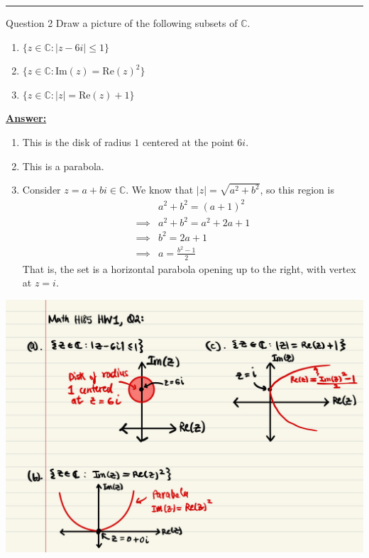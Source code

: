 \documentclass{article}
\newcommand{\C}{\mathbb{C}}
\begin{document}
\vskip 0.5cm
\hrule 
\vskip 0.5cm


\begin{mathdefinitionbox}{Question 2}
\vskip 0.5cm
  Draw a picture of the following subsets of $\C$.
  \begin{enumerate}[label=(\alph*)]
    \item $\{ z \in \C : |z - 6i| \leq 1 \}$
    \item $\{ z \in \C : \text{Im}(z) = \text{Re}(z)^2 \}$
    \item $\{ z \in \C : |z| = \text{Re}(z) + 1 \}$
  \end{enumerate}
\end{mathdefinitionbox}

\vskip 0.5cm
\underline{\textbf{Answer:}} 

\begin{enumerate}[label=(\alph*)]
  \item This is the disk of radius $1$ centered at the point $6i$.

  \vskip 0.5cm
  \item This is a parabola.
  
  \vskip 0.5cm
  \item Consider $z = a + bi \in \C$. We know that $|z| = \sqrt{a^2 + b^2}$, so this region is 
  \begin{align*}
    &a^2 + b^2 = (a + 1)^2\\
    \implies &a^2 + b^2 = a^2 + 2a + 1 \\
    \implies &b^2 = 2a + 1 \\
    \implies &a = \frac{b^2 - 1}{2}
  \end{align*}
  That is, the set is a horizontal parabola opening up to the right, with vertex at $z = i$.

\end{enumerate}

\includegraphics[scale=0.30]{Q2 HW 1.jpg}
\end{document}

